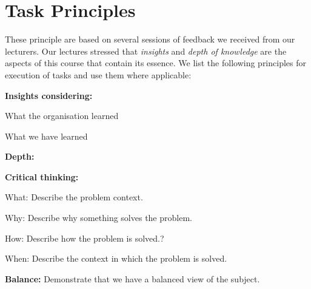\section{Task Principles}
These principle are based on several sessions of feedback we received from our lecturers.
Our lectures stressed that \emph{insights} and \emph{depth of knowledge} are the aspects of this course that contain its essence. We list the following principles for execution of tasks and use them where applicable:
\begin{compactenum}
  \item \textbf{Insights considering:}
  \begin{compactenum}
    \item What the organisation learned
    \item What we have learned
  \end{compactenum}
  \item \textbf{Depth:}
  \begin{compactenum}
    \item \textbf{Critical thinking:}
    \begin{compactdesc}
      \item[What:] Describe the problem context.
      \item[Why:] Describe why something solves the problem.
      \item[How:] Describe how the problem is solved.?
      \item[When:] Describe the  context in which the problem is solved.
    \end{compactdesc}
    \item \textbf{Balance:} Demonstrate that we have a balanced view of the subject.
  \end{compactenum}
\end{compactenum}